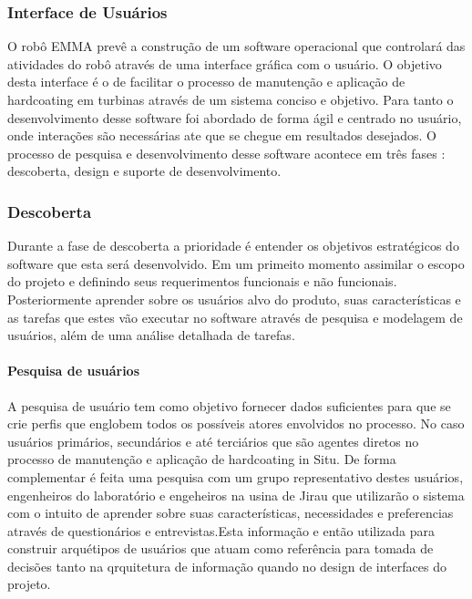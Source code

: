  \subsubsection{Interface de Usuários}\label{sec::interface} 

O robô EMMA prevê a construção de um software operacional que 
controlará das atividades do robô através de uma interface gráfica com o
usuário.
O objetivo desta interface é o de facilitar o processo de manutenção e aplicação
de hardcoating em turbinas através de um sistema conciso e objetivo. Para tanto
o desenvolvimento desse software foi abordado de forma ágil e centrado no
usuário, onde interações são necessárias ate que se chegue em resultados
desejados.
O processo de pesquisa e desenvolvimento desse software acontece em três fases :
descoberta, design e suporte de desenvolvimento.

\subsubsection{Descoberta}

Durante a fase de descoberta a prioridade é entender os objetivos estratégicos
do software que esta será desenvolvido. Em um primeito momento assimilar o
escopo do projeto e definindo seus requerimentos funcionais e não funcionais. 
Posteriormente aprender sobre os usuários alvo do produto, suas características
e as tarefas que estes vão executar no software através de pesquisa e
modelagem de usuários, além de uma análise detalhada de tarefas.

\paragraph{Pesquisa de usuários}
A pesquisa de usuário tem como objetivo fornecer dados suficientes para que se
crie perfis que englobem todos os possíveis atores envolvidos no
processo. No caso usuários primários, secundários e até terciários que são
agentes diretos no processo de manutenção e aplicação de hardcoating in Situ.
De forma complementar é feita uma pesquisa com um grupo representativo
destes usuários, engenheiros do laboratório e engeheiros na usina de Jirau que
utilizarão o sistema com o intuito de aprender sobre suas características, necessidades
e preferencias através de questionários e entrevistas.Esta informação e então
utilizada para construir arquétipos de usuários que atuam como referência para
tomada de decisões tanto na qrquitetura de informação quando no design de
interfaces do projeto.


